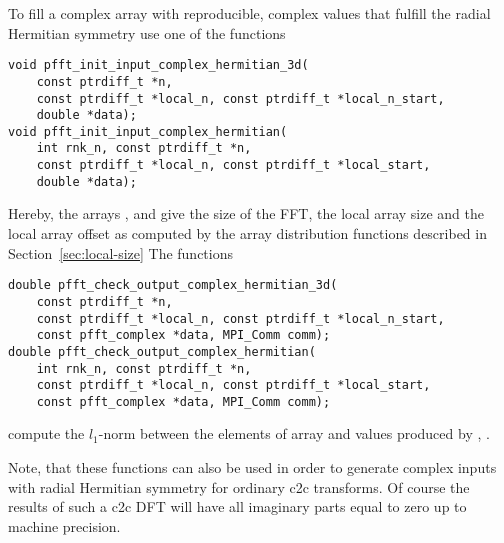 To fill a complex array  with reproducible, complex values that fulfill the radial Hermitian symmetry use one of the functions
\begin{lstlisting}
void pfft_init_input_complex_hermitian_3d(
    const ptrdiff_t *n,
    const ptrdiff_t *local_n, const ptrdiff_t *local_n_start,
    double *data);
void pfft_init_input_complex_hermitian(
    int rnk_n, const ptrdiff_t *n,
    const ptrdiff_t *local_n, const ptrdiff_t *local_start,
    double *data);
\end{lstlisting}
Hereby, the arrays ,  and  give the size of the FFT, the local array size and the local array offset
as computed by the array distribution functions described in Section~\ref{sec:local-size}
The functions
\begin{lstlisting}
double pfft_check_output_complex_hermitian_3d(
    const ptrdiff_t *n,
    const ptrdiff_t *local_n, const ptrdiff_t *local_n_start,
    const pfft_complex *data, MPI_Comm comm);
double pfft_check_output_complex_hermitian(
    int rnk_n, const ptrdiff_t *n,
    const ptrdiff_t *local_n, const ptrdiff_t *local_start,
    const pfft_complex *data, MPI_Comm comm);
\end{lstlisting}
compute the $l_1$-norm between the elements of array  and values produced by , .

Note, that these functions can also be used in order to generate complex inputs with radial Hermitian symmetry for ordinary c2c transforms. 
Of course the results of such a c2c DFT will have all imaginary parts equal to zero up to machine precision.




